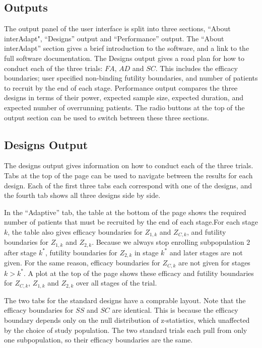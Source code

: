 \documentclass{article}
\begin{document}
\subsection*{Outputs}

The output panel of the user interface is split into three sections, ``About interAdapt", ``Designs'' output and ``Performance'' output. The ``About interAdapt'' section gives a brief introduction to the software, and a link to the full software documentation. The Designs output gives a road plan for how to conduct each of the three trials: $FA$, $AD$ and $SC$. This includes the efficacy boundaries; user specified non-binding futility boundaries, and number of patients to recruit by the end of each stage. Performance output compares the three designs in terms of their power, expected sample size, expected duration, and expected number of overrunning patients. 
The radio buttons at the top of the output section can be used to switch between these three sections. 


\subsection*{Designs Output}

The designs output gives information on how to conduct each of the three trials. Tabs at the top of the page can be used to navigate between the results for each design. Each of the first three tabs each correspond with one of the designs, and the fourth tab shows all three designs side by side. 

In the “Adaptive” tab, the table at the bottom of the page shows the required number of patients that must be recruited by the end of each stage.For each stage $k$, the table also gives efficacy boundaries for $Z_{1,k}$ and $Z_{C,k}$, and futility boundaries for $Z_{1,k}$ and $Z_{2,k}$. Because we always stop enrolling subpopulation $2$ after stage $k^*$, futility boundaries for $Z_{2,k}$ in stage $k^*$ and later stages are not given. For the same reason, efficacy boundaries for $Z_{C,k}$ are not given for stages $k>k^*$. A plot at the top of the page shows these efficacy and futility boundaries for $Z_{C,k}$, $Z_{1,k}$ and $Z_{2,k}$ over all stages of the trial.

The two tabs for the standard designs have a comprable layout. Note that the efficacy boundaries for $SS$ and $SC$ are identical. This is because the efficacy boundary depends only on the null distribution of z-statistics, which unaffected by the choice of study population. The two standard trials each pull from only one subpopulation, so their efficacy boundaries are the same.
\end{document}
